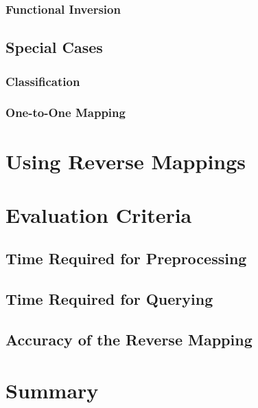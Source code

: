    \subsubsection{Functional Inversion}
   \label{subsec:funcinvert}


\subsection{Special Cases}

   \subsubsection{Classification}

   \subsubsection{One-to-One Mapping}

\section{Using Reverse Mappings}


\section{Evaluation Criteria}

\subsection{Time Required for Preprocessing}

\subsection{Time Required for Querying}

\subsection{Accuracy of the Reverse Mapping}


\section{Summary}




